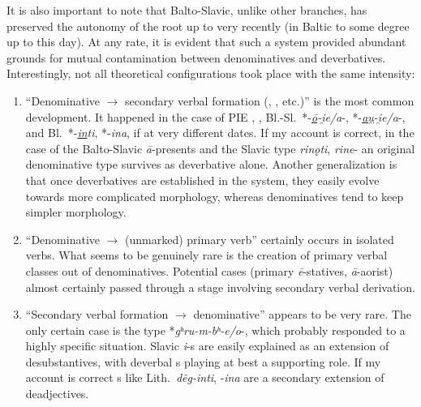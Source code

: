 \documentclass[output=paper,colorlinks,citecolor=brown]{langscibook}
\begin{document}
It is also important to note that Balto-Slavic, unlike other branches, has preserved the autonomy of the root up to very recently (in Baltic to some degree up to this day). At any rate, it is evident that such a system provided abundant grounds for mutual contamination between denominatives and deverbatives. Interestingly, not all theoretical configurations took place with the same intensity:

\begin{enumerate}
    \item “Denominative $\rightarrow$ secondary verbal formation (, , etc.)” is the most common development. It happened in the case of PIE , , Bl.-Sl.\ *-\textit{\underline{ō}-i̯e/a}-, *-\textit{\underline{au̯}-i̯e/a}-, and Bl.\ *-\textit{\underline{in}ti}, *-\textit{ina}, if at very different dates. If my account is correct, in the case of the Balto-Slavic \textit{ā}-presents and the Slavic type \textit{rinǫti}, \textit{rine}- an original denominative type survives as deverbative alone. Another generalization is that once deverbatives are established in the system, they easily evolve towards more complicated morphology, whereas denominatives tend to keep simpler morphology.

    \item “Denominative $\rightarrow$ (unmarked) primary verb” certainly occurs in isolated verbs. What seems to be genuinely rare is the creation of primary verbal classes out of denominatives. Potential cases (primary \textit{ē}-statives, \textit{ā}-aorist) almost certainly passed through a stage involving secondary verbal derivation.

    \item “Secondary verbal formation $\rightarrow$ denominative” appears to be very rare. The only certain case is the    type *\textit{gʰru\nobreakdash-m-bʰ-e/o}-, which probably responded to a highly specific situation. Slavic \textit{i}-s are easily explained as an extension of  desubstantives, with deverbal s playing at best a supporting role. If my account is correct s like Lith.\ \textit{dẽg-inti}, -\textit{ina} are a secondary extension of  deadjectives.


\end{enumerate}
\end{document}
